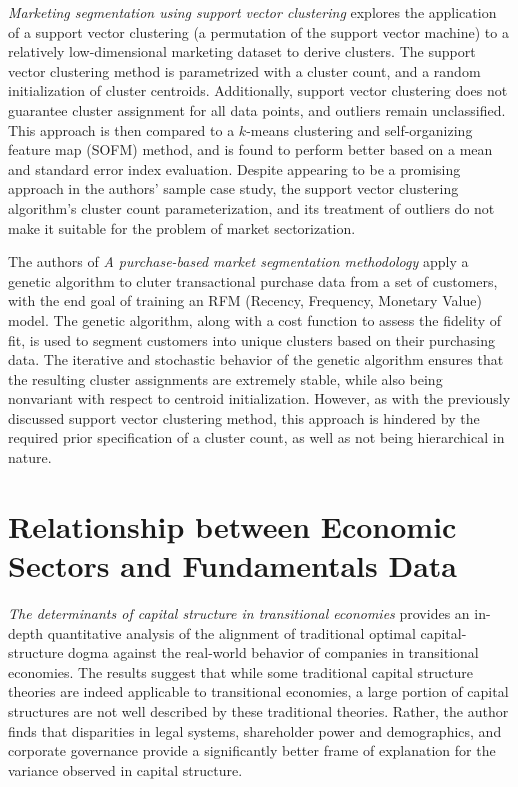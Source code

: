 \documentclass[../main.tex]{subfiles}
\begin{document}
\textit{Marketing segmentation using support vector clustering} explores the application of a support vector clustering (a permutation of the support vector machine) to a relatively low-dimensional marketing dataset to derive clusters. The support vector clustering method is parametrized with a cluster count, and a random initialization of cluster centroids. Additionally, support vector clustering does not guarantee cluster assignment for all data points, and outliers remain unclassified. This approach is then compared to a $k$-means clustering and self-organizing feature map (SOFM) method, and is found to perform better based on a mean and standard error index evaluation. Despite appearing to be a promising approach in the authors' sample case study, the support vector clustering algorithm's cluster count parameterization, and its treatment of outliers do not make it suitable for the problem of market sectorization.

The authors of \textit{A purchase-based market segmentation methodology} apply a genetic algorithm to cluter transactional purchase data from a set of customers, with the end goal of training an RFM (Recency, Frequency, Monetary Value) model. The genetic algorithm, along with a cost function to assess the fidelity of fit, is used to segment customers into unique clusters based on their purchasing data. The iterative and stochastic behavior of the genetic algorithm ensures that the resulting cluster assignments are extremely stable, while also being nonvariant with respect to centroid initialization. However, as with the previously discussed support vector clustering method, this approach is hindered by the required prior specification of a cluster count, as well as not being hierarchical in nature.

\pagebreak

\section{Relationship between Economic Sectors and Fundamentals Data}

\textit{The determinants of capital structure in transitional economies} provides an in-depth quantitative analysis of the alignment of traditional optimal capital-structure dogma against the real-world behavior of companies in transitional economies. The results suggest that while some traditional capital structure theories are indeed applicable to transitional economies, a large portion of capital structures are not well described by these traditional theories. Rather, the author finds that disparities in legal systems, shareholder power and demographics, and corporate governance provide a significantly better frame of explanation for the variance observed in capital structure.
\end{document}
